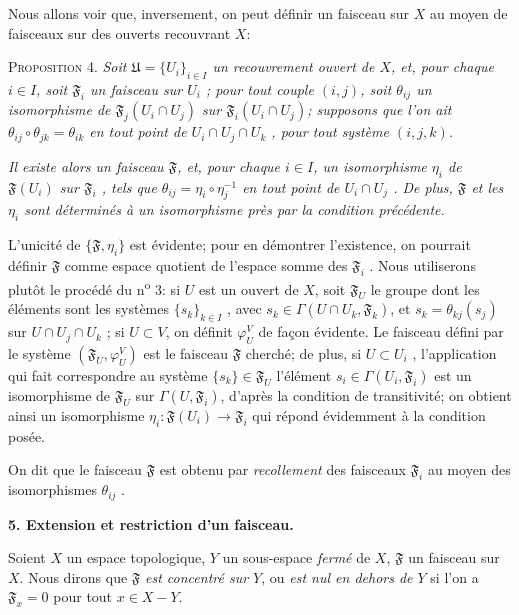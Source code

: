 Nous allons voir que, inversement, on peut définir un faisceau sur $X$ au moyen de faisceaux sur des ouverts recouvrant $X$:

\textsc{Proposition} 4. \textit{Soit $\mathfrak{U} = \{U_i\}_{i \in I}$ un recouvrement ouvert de $X$, et, pour chaque $i \in I$, soit $\mathfrak{F}_i$ un faisceau sur $U_i$ ; pour tout couple $(i, j)$, soit $\theta_{ij}$ un isomorphisme de $\mathfrak{F}_j(U_i \cap U_j)$ sur $\mathfrak{F}_i(U_i \cap U_j)$; supposons que l'on ait $\theta_{ij} \circ \theta_{jk} = \theta_{ik}$ en tout point de $U_i \cap U_j \cap U_k$ , pour tout système $(i, j, k)$.}

\textit{Il existe alors un faisceau $\mathfrak{F}$, et, pour chaque $i \in I$, un isomorphisme $\eta_i$ de $\mathfrak{F}(U_i)$ sur $\mathfrak{F}_i$ , tels que $\theta_{ij} = \eta_i \circ \eta_j^{-1}$ en tout point de $U_i \cap U_j$ . De plus, $\mathfrak{F}$ et les $\eta_i$ sont déterminés à un isomorphisme près par la condition précédente.}

L'unicité de $\{\mathfrak{F}, \eta_i\}$ est évidente; pour en démontrer l'existence, on pourrait
définir $\mathfrak{F}$ comme espace quotient de l'espace somme des $\mathfrak{F}_i$ . Nous utiliserons plutôt le procédé du n\textsuperscript{o} 3: si $U$ est un ouvert de $X$, soit $\mathfrak{F}_U$ le groupe dont les éléments sont les systèmes $\{s_k\}_{k \in I}$ , avec $s_k \in \Gamma(U \cap U_k , \mathfrak{F}_k)$, et $s_k = \theta_{kj}(s_j)$ sur $U \cap U_j \cap U_k$ ; si $U \subset V$, on définit $\varphi^{V}_{U}$ de façon évidente. Le faisceau défini par le système $(\mathfrak{F}_U , \varphi^{V}_{U})$ est le faisceau $\mathfrak{F}$ cherché; de plus, si $U \subset U_i$ , l'application qui fait correspondre au système $\{s_k\} \in \mathfrak{F}_U$ l'élément $s_i \in \Gamma(U_i , \mathfrak{F}_i)$ est un isomorphisme de $\mathfrak{F}_U$ sur $\Gamma(U, \mathfrak{F}_i)$, d'après la condition de transitivité; on obtient ainsi un isomorphisme $\eta_i : \mathfrak{F}(U_i) \to \mathfrak{F}_i$ qui répond évidemment à la condition posée.

On dit que le faisceau $\mathfrak{F}$ est obtenu par \textit{recollement} des faisceaux $\mathfrak{F}_i$ au moyen des isomorphismes $\theta_{ij}$ .


\textbf{5. Extension et restriction d'un faisceau.}

Soient $X$ un espace topologique, $Y$ un sous-espace \textit{fermé} de $X$, $\mathfrak{F}$ un faisceau sur $X$. Nous dirons que $\mathfrak{F}$ \textit{est concentré sur $Y$}, ou \textit{est nul en dehors de $Y$} si l'on a $\mathfrak{F}_x = 0$ pour tout $x \in X - Y$.

